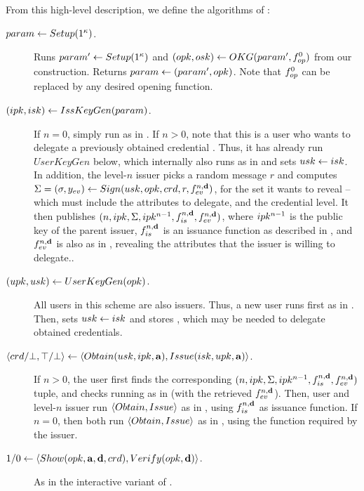 From this high-level description, we define the algorithms of \CUASDAC:

\begin{description}
\item[$param \gets Setup(1^\kappa)$.]  Runs $param' \gets Setup(1^\kappa)$
    and $(opk,osk) \gets OKG(param',f_{op}^0)$ from our \CUASGen
    construction. Returns $param \gets (param',opk)$. Note that $f_{op}^0$ can
    be replaced by any desired opening function.
\item[$(ipk,isk) \gets IssKeyGen(param)$.] If $n=0$, simply run \IKeyGen as
  in \CUASAC. If $n>0$, note that this is a user who wants to delegate a
  previously obtained credential \cred. Thus, it has already run $UserKeyGen$
  below, which internally also runs \IKeyGen as in \CUASGen and sets $usk \gets
  isk$. In addition, the level-$n$ issuer picks a random message $r$ and
  computes $\Sigma = (\sigma,y_{ev}) \gets Sign(usk,opk,crd,r,
  f_{ev}^{n,\mathbf{d}})$, for the \dattrs set it wants to reveal -- which must
  include the attributes to delegate, and the credential level. It then
  publishes $(n,ipk,\Sigma,ipk^{n-1},f_{is}^{n,\mathbf{d}},f_{ev}^{n,\mathbf{d}})$,
  where $ipk^{n-1}$ is the public key of the parent issuer,
  $f_{is}^{n,\mathbf{d}}$ is an issuance function as described in
  , and $f_{ev}^{n,\mathbf{d}}$ is also as in
  , revealing the attributes that the issuer is willing to
  delegate..
\item[$(upk,usk) \gets UserKeyGen(opk)$.] All users in this scheme are
  also issuers. Thus, a new user runs first \IKeyGen as in \CUASGen. Then, sets
  $usk \gets isk$ and stores \ipk, which may be needed to delegate obtained
  credentials.
\item[$\langle crd/\bot,\top/\bot \rangle \gets
  \langle Obtain(usk,ipk,\mathbf{a}),Issue(isk,upk,\mathbf{a}) \rangle$.]
  If $n>0$, the user first finds the corresponding $(n,ipk,\Sigma,ipk^{n-1},
  f_{is}^{n,\mathbf{d}},f_{ev}^{n,\mathbf{d}})$ tuple, and checks \Sig running
  \Verify as in \CUASGen (with the retrieved $f_{ev}^{n,\mathbf{d}}$). Then,
  user and level-$n$ issuer run $\langle Obtain,Issue\rangle$ as in \CUASGen,
  using $f_{is}^{n,\mathbf{d}}$ as issuance function. If $n=0$, then both run
  $\langle Obtain,Issue\rangle$ as in \CUASGen, using the \fissue function
  required by the issuer.
\item[$1/0 \gets \langle Show(opk,\mathbf{a},\mathbf{d},crd),
  Verify(opk,\mathbf{d}) \rangle$.] As in the interactive variant of \CUASGen.  
\end{description}

